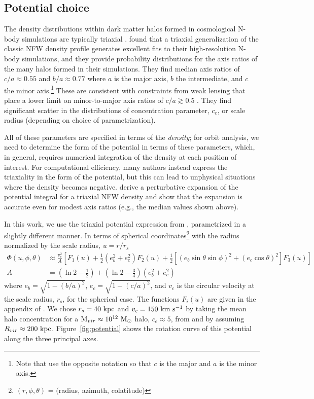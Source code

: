 \documentclass[letterpaper,12pt,preprint]{aastex}
\newcommand{\msun}{\mathrm{M}_\odot}
\begin{document}
\subsection{Potential choice}\label{sec:potential}

The density distributions within dark matter halos formed in cosmological N-body simulations are typically triaxial \citep[e.g.,][]{jing02, bett07, zemp09, veraciro11}. \citet{jing02} found that a triaxial generalization of the classic NFW density profile \citep{navarro96} generates excellent fits to their high-resolution N-body simulations, and they provide probability distributions for the axis ratios of the many halos formed in their simulations. They find median axis ratios of $c/a \approx 0.55$ and $b/a \approx 0.77$ where $a$ is the major axis, $b$ the intermediate, and $c$ the minor axis.\footnote{Note that \citet{jing02} use the opposite notation so that $c$ is the major and $a$ is the minor axis.} These are consistent with constraints from weak lensing that place a lower limit on minor-to-major axis ratios of $c/a\gtrsim0.5$ \citep{vanuitert12}. They find significant scatter in the distributions of concentration parameter, $c_e$, or scale radius (depending on choice of parametrization). 

All of these parameters are specified in terms of the \emph{density}; for orbit analysis, we need to determine the form of the potential in terms of these parameters, which, in general, requires numerical integration of the density at each position of interest. For computational efficiency, many authors instead express the triaxiality in the form of the potential, but this can lead to unphysical situations where the density becomes negative. \citet{leesuto03} derive a perturbative expansion of the potential integral for a triaxial NFW density and show that the expansion is accurate even for modest axis ratios (e.g., the median values shown above). 

In this work, we use the triaxial potential expression from \citet{leesuto03}, parametrized in a slightly different manner. In terms of spherical coordinates\footnote{$(r,\phi,\theta)$ = (radius, azimuth, colatitude)} with the radius normalized by the scale radius, $u = r/r_s$
\begin{align}
	\Phi(u,\phi,\theta) &\approx \frac{v_c^2}{A}\left[F_1(u) + \frac{1}{2}(e_b^2 + e_c^2)F_2(u) + \frac{1}{2} [(e_b\sin\theta \sin\phi)^2 + (e_c\cos\theta)^2] F_3(u) \right]\\
	A &= \left(\ln2 - \frac{1}{2}\right) + \left(\ln2-\frac{3}{4}\right) (e_b^2 + e_c^2)
\end{align}
where $e_b = \sqrt{1 - (b/a)^2}$, $e_c = \sqrt{1 - (c/a)^2}$, and $v_c$ is the circular velocity at the scale radius, $r_s$, for the spherical case. The functions $F_i(u)$ are given in the appendix of \cite{leesuto03}. We chose $r_s=40~{\rm kpc}$ and $v_c = 150~{\rm km}~{\rm s}^{-1}$ by taking the mean halo concentration for a ${\rm M}_{vir} \approx 10^{12}~\msun$ halo, $c_e\approx5$, from \cite{jing02} and by assuming $R_{vir}\approx200~{\rm kpc}$. Figure~\ref{fig:potential} shows the rotation curve of this potential along the three principal axes.
\end{document}
